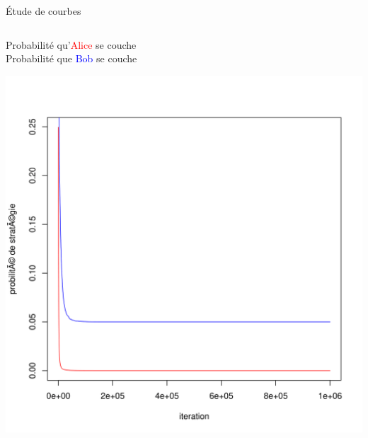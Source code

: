 \begin{frame}{Étude de courbes}
\begin{columns}
        \begin{column}{0.5 \textwidth}
        \begin{small}
       \hspace{-0.24 cm} Probabilité qu'\textcolor{red}{Alice} se couche \\ Probabilité que \textcolor{blue}{Bob} se couche\\
        \end{small}
        \centering
            \includegraphics[width =\textwidth]{Images/Courbes/LRI/SeCoucher.png}
       
    
        \end{column}
       

\end{columns}
\end{frame}
